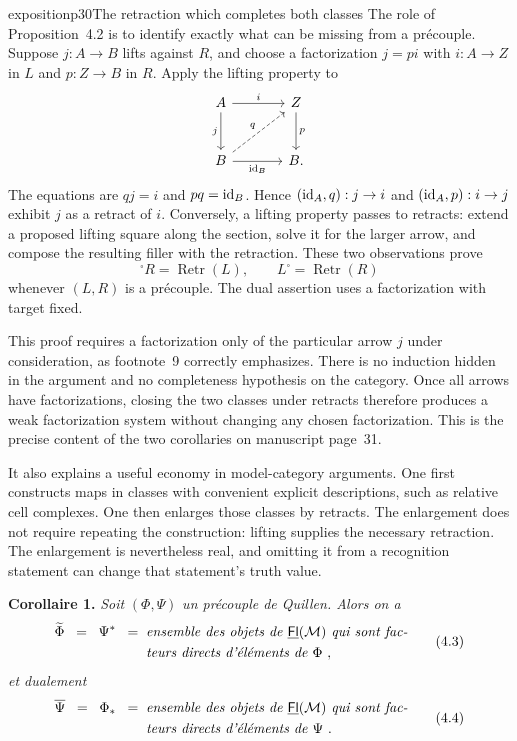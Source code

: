 \begin{dcomment}{exposition}{p30}{The retraction which completes both classes}
The role of Proposition~4.2 is to identify exactly what can be missing from a pr\'ecouple. Suppose $j:A\to B$ lifts against $R$, and choose a factorization $j=pi$ with $i:A\to Z$ in $L$ and $p:Z\to B$ in $R$. Apply the lifting property to
\[
\begin{tikzcd}[row sep=large,column sep=large]
A \arrow[r,"i"] \arrow[d,"j"'] & Z \arrow[d,"p"]\\
B \arrow[r,"\id_B"'] \arrow[ur,dashed,"q"] & B .
\end{tikzcd}
\]
The equations are $qj=i$ and $pq=\mathrm{id}_B$. Hence $(\mathrm{id}_A,q):j\to i$ and $(\mathrm{id}_A,p):i\to j$ exhibit $j$ as a retract of $i$. Conversely, a lifting property passes to retracts: extend a proposed lifting square along the section, solve it for the larger arrow, and compose the resulting filler with the retraction. These two observations prove
\[
{}^{\square}R=\operatorname{Retr}(L),\qquad
L^{\square}=\operatorname{Retr}(R)
\]
whenever $(L,R)$ is a pr\'ecouple. The dual assertion uses a factorization with target fixed.

This proof requires a factorization only of the particular arrow $j$ under consideration, as footnote~9 correctly emphasizes. There is no induction hidden in the argument and no completeness hypothesis on the category. Once all arrows have factorizations, closing the two classes under retracts therefore produces a weak factorization system without changing any chosen factorization. This is the precise content of the two corollaries on manuscript page~31.

It also explains a useful economy in model-category arguments. One first constructs maps in classes with convenient explicit descriptions, such as relative cell complexes. One then enlarges those classes by retracts. The enlargement does not require repeating the construction: lifting supplies the necessary retraction. The enlargement is nevertheless real, and omitting it from a recognition statement can change that statement's truth value.
\end{dcomment}


\textbf{Corollaire 1.} \textit{Soit} $(\Phi,\Psi)$ \textit{un précouple de Quillen. Alors on a}
\[
\begin{aligned}
\widetilde{\Phi} \;\;=\;\; \Psi^* \;\;=\;\; &\textit{ensemble des objets de } \underline{\Fl}(\mathcal{M}) \textit{ qui sont fac-}\\
&\textit{teurs directs d'éléments de } \Phi\ ,
\end{aligned}
\tag*{(4.3)}
\] %
\textit{et dualement}
\[
\begin{aligned}
\overline{\Psi} \;\;=\;\; \Phi_* \;\;=\;\; &\textit{ensemble des objets de } \underline{\Fl}(\mathcal{M}) \textit{ qui sont fac-}\\
&\textit{teurs directs d'éléments de } \Psi\ .
\end{aligned}
\tag*{(4.4)}
\] %

